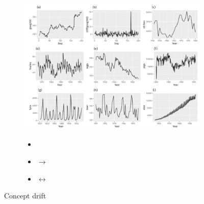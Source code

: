 \begin{figure}[H]
  \vspace*{0.5cm}
  \begin{subfigure}{0.45\textwidth}
    \centering
    \includegraphics[width=\textwidth]{assets/sl/cross_val__out_of_time_model_drift.png}
  \end{subfigure}
  \hspace*{0.05\textwidth}
  \begin{subfigure}{0.45\textwidth}
    \centering
    \begin{itemize}
      \item {}
      \item $\rightarrow$ 
      \item {} $\leftrightarrow$ 
    \end{itemize}
  \end{subfigure}

  \caption{Concept drift}
  \label{fig:7_concept_drift}
\end{figure}


